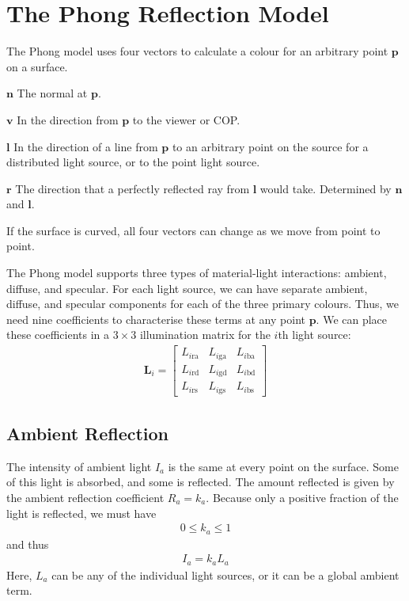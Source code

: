 \documentclass[../COS3712_Notes.tex]{subfiles}
\begin{document}
    \section{The Phong Reflection Model}
      \label{sec:phong-reflection}
      The Phong model uses four vectors to calculate a colour for an arbitrary point $\mathbf{p}$
      on a surface.
      \begin{descriptimize}[nosep]
        \item[$\mathbf{n}$] The normal at $\mathbf{p}$.
        \item[$\mathbf{v}$] In the direction from $\mathbf{p}$ to the viewer or COP.
        \item[$\mathbf{l}$] In the direction of a line from $\mathbf{p}$ to an arbitrary point
          on the source for a distributed light source, or to the point light source.
        \item[$\mathbf{r}$] The direction that a perfectly reflected ray from $\mathbf{l}$ would
          take.
          Determined by $\mathbf{n}$ and $\mathbf{l}$.
      \end{descriptimize}
      If the surface is curved, all four vectors can change as we move from point to point.

      The Phong model supports three types of material-light interactions: ambient, diffuse,
      and specular.
      For each light source, we can have separate ambient, diffuse, and specular components
      for each of the three primary colours.
      Thus, we need nine coefficients to characterise these terms at any point $\mathbf{p}$.
      We can place these coefficients in a $3 \times 3$ illumination matrix for the $i$th
      light source:
      \begin{align*}
        \mathbf{L}_i = \begin{bmatrix}
          L_{i\mathrm{ra}} & L_{i\mathrm{ga}} & L_{i\mathrm{ba}} \\
          L_{i\mathrm{rd}} & L_{i\mathrm{gd}} & L_{i\mathrm{bd}} \\
          L_{i\mathrm{rs}} & L_{i\mathrm{gs}} & L_{i\mathrm{bs}}
        \end{bmatrix}
      \end{align*}

      \subsection{Ambient Reflection}
        The intensity of ambient light $I_a$ is the same at every point on the surface.
        Some of this light is absorbed, and some is reflected.
        The amount reflected is given by the ambient reflection coefficient $R_a = k_a$.
        Because only a positive fraction of the light is reflected,
        we must have
        \begin{align*}
          0 \leq k_a \leq 1
        \end{align*}
        and thus
        \begin{align*}
          I_a = k_a L_a
        \end{align*}
        Here, $L_a$ can be any of the individual light sources,
        or it can be a global ambient term.
\end{document}
